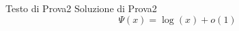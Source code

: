 \documentclass[../main.tex]{subfiles}
\begin{document}
{
Testo di Prova2
}
{
Soluzione di Prova2
$$\Psi(x)=\log(x)+o(1)$$
}
\end{document}
